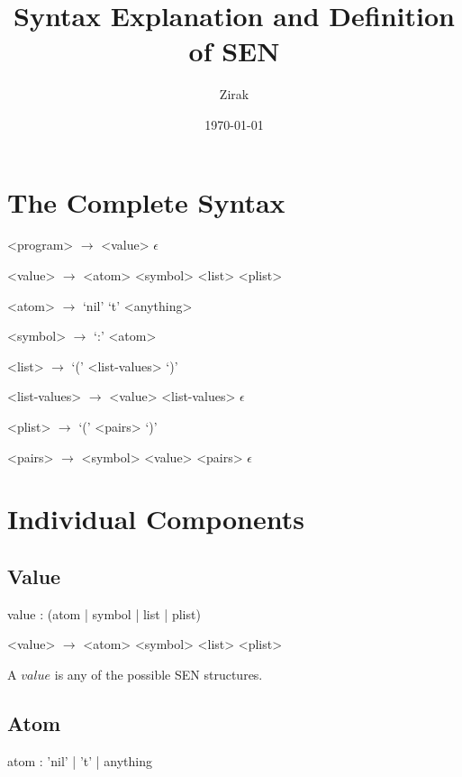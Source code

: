 \documentclass[a4paper]{article}
\begin{document}
\title{Syntax Explanation and Definition of SEN}
\author{Zirak}
\date{\today}

\maketitle

\tableofcontents

\section{The Complete Syntax}

\begin{grammar}
	<program> $\to$ <value>
		\alt $\epsilon$
		
	<value> $\to$ <atom>
		\alt <symbol>
		\alt <plist>
		
	<atom> $\to$ `nil'
		\alt `t'
		\alt <anything>
		
	<symbol> $\to$ `:' <atom>
	
	<list> $\to$ `(' <list-values> `)'

	<list-values> $\to$ <value> <list-values>
		\alt $\epsilon$
		
	<plist> $\to$ `(' <pairs> `)'

	<pairs> $\to$ <symbol> <value> <pairs>
		\alt $\epsilon$
\end{grammar}

\section{Individual Components}

\subsection{Value}
\begin{rail}
	value : (atom | symbol | list | plist)
\end{rail}

\begin{grammar}
	<value> $\to$ <atom>
		\alt <symbol>
		\alt <plist>
\end{grammar}

A $value$ is any of the possible SEN structures.

\subsection{Atom}
\begin{rail}
	atom : 'nil' | 't' | anything
\end{rail}
\end{document}
